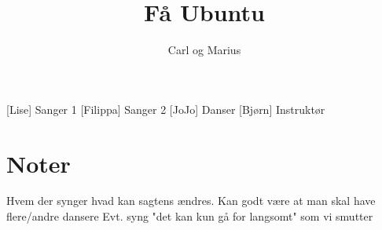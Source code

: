\documentclass[a4paper,11pt]{article}
\title{Få Ubuntu}
\author{Carl og Marius}
\begin{document}
\maketitle

\begin{roles}
[Lise] Sanger 1
[Filippa] Sanger 2
[JoJo] Danser
[Bjørn] Instruktør
\end{roles} 

\section*{Noter}
Hvem der synger hvad kan sagtens ændres. Kan godt være at man skal have flere/andre dansere 
Evt. syng "det kan kun gå for langsomt" som vi smutter

\begin{props}
\prop{}
\prop{}
\prop{}
\prop{}
\prop{}
\prop{}
\end{props}
\end{document}
